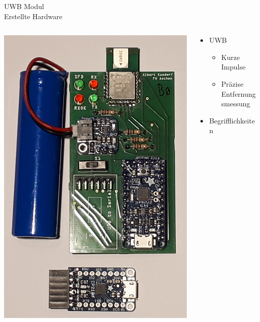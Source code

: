 \documentclass{beamer}
\begin{document}
\begin{frame}{UWB Modul\\\normalsize{Erstellte Hardware}}
	\begin{columns}
		\begin{column}{0.5\linewidth}
			\centering
			\includegraphics[width=0.8\linewidth]{uwb_modul2}
		\end{column}
		\begin{column}{0.5\linewidth}
			\begin{itemize}
				\item<1-> UWB
				\begin{itemize}
					\item Kurze Impulse
					\item Präzise Entfernungsmessung
				\end{itemize}
				\item<2-> Begrifflichkeiten
				\begin{itemize}

\end{itemize}
\end{itemize}
\end{column}
\end{columns}
\end{frame}
\end{document}
